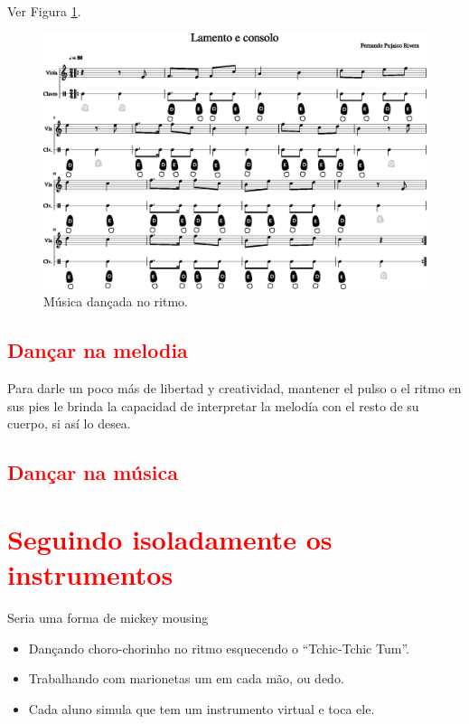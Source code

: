 Ver Figura \ref{fig:lamentoconsoloritmo1}.
\begin{figure}
    \centering
    \includegraphics[width=\textwidth]{chapters/cap-musicalidade-tecnica/lamento-e-consolo-clave-ritmo-1.eps}
    \caption{Música dançada no ritmo.}
    \label{fig:lamentoconsoloritmo1}
\end{figure}

\subsection{\textcolor{red}{Dançar na melodia}}
Para darle un poco más de libertad y creatividad, 
mantener el pulso o el ritmo en sus pies le brinda la capacidad de interpretar 
la melodía con el resto de su cuerpo, si así lo desea.

\subsection{\textcolor{red}{Dançar na música}}

\section{\textcolor{red}{Seguindo isoladamente os instrumentos}}
Seria uma forma de mickey mousing
\begin{itemize}
\item Dançando choro-chorinho no ritmo esquecendo o ``Tchic-Tchic Tum''.
\item Trabalhando com marionetas um em cada mão, ou dedo.
\item Cada aluno simula que tem um instrumento virtual e toca ele.
\end{itemize}

